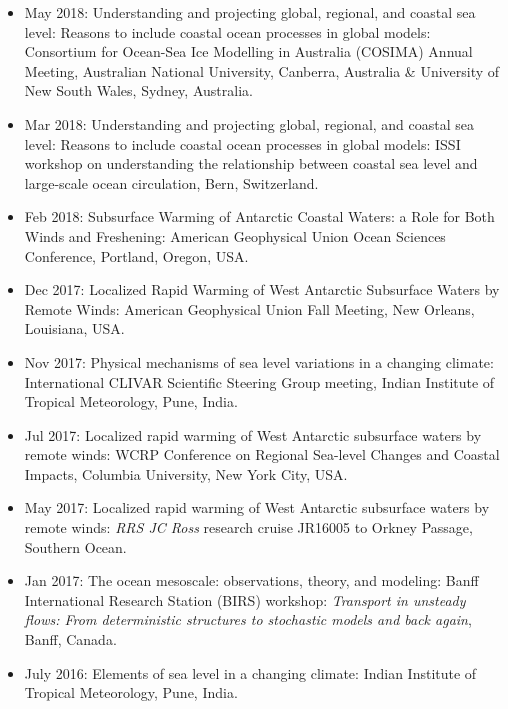 \documentclass{article}
\begin{document}
\begin{itemize}[leftmargin=*]

\item May 2018: {\sc Understanding and projecting global, regional, and coastal sea level: Reasons to include coastal ocean processes in global models}: Consortium for Ocean-Sea Ice Modelling in Australia (COSIMA) Annual Meeting, Australian National University, Canberra, Australia \& University of New South Wales, Sydney, Australia. 

\item Mar 2018: {\sc Understanding and projecting global, regional, and coastal sea level: Reasons to include coastal ocean processes in global models}: ISSI workshop on understanding the relationship between coastal sea level and large-scale ocean circulation, Bern, Switzerland. 

\item Feb 2018: {\sc Subsurface Warming of Antarctic Coastal Waters: a Role for Both Winds and Freshening}: {\sc American Geophysical Union Ocean Sciences Conference}, Portland, Oregon, USA.

\item Dec 2017: {\sc Localized Rapid Warming of West Antarctic Subsurface Waters by Remote Winds}: American Geophysical Union Fall Meeting, New Orleans, Louisiana, USA. 

\item Nov 2017: {\sc Physical mechanisms of sea level variations in a changing climate}: International CLIVAR Scientific Steering Group meeting, Indian Institute of Tropical Meteorology, Pune, India.


\item Jul 2017: {\sc Localized rapid warming of West Antarctic
    subsurface waters by remote winds}: WCRP Conference on Regional
  Sea-level Changes and Coastal Impacts, Columbia University, New York City, USA. 

\item May 2017: {\sc Localized rapid warming of West Antarctic
    subsurface waters by remote winds}: {\it RRS JC Ross} research cruise
  JR16005 to Orkney Passage, Southern Ocean.

\item Jan 2017: {\sc The ocean mesoscale: observations, theory, and
    modeling}: Banff International Research Station (BIRS) workshop:
  {\it Transport in unsteady flows: From deterministic structures to
    stochastic models and back again}, Banff, Canada.

\item July 2016: {\sc Elements of sea level in a changing climate}:
  Indian Institute of Tropical Meteorology, Pune, India.


\end{itemize}
\end{document}
